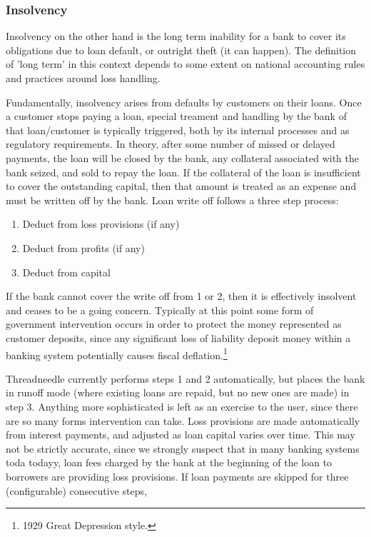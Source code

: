 \documentclass[10pt,oneside,openright, a4paper]{memoir}
\begin{document}
\subsubsection{Insolvency}
Insolvency on the other hand 
is the long term inability for a bank to cover its 
obligations due to loan default, or outright theft (it can happen). 
The definition of 'long term' in this context
depends to some extent on national accounting rules and practices
around loss handling.
\par
Fundamentally, insolvency arises from defaults by customers on their loans.
Once a customer stops paying a loan, special treament and handling
by the bank of that loan/customer is typically triggered, both by its 
internal processes and as regulatory requirements. In theory, after
some number of missed or delayed payments, the loan will be closed
by the bank, any collateral associated with the bank seized,
and sold to repay the loan. If the collateral of the loan is insufficient
to cover the outstanding capital, then that amount is treated as an
expense and must be written 
off by the bank. Loan write off follows a three step process:
\begin{enumerate}
\item Deduct from loss provisions (if any)
\item Deduct from profits (if any)
\item Deduct from capital
\end{enumerate}
If the bank cannot cover the write off from 1 or 2, then it is 
effectively insolvent and ceases to be a going concern. Typically
at this point some form of government intervention occurs in order
to protect the money represented as customer deposits, since any
significant loss of liability deposit money within a banking
system potentially causes fiscal deflation.\footnote{1929 Great
Depression style.}
\par
Threadneedle currently performs steps 1 and 2 automatically, but places
the bank in runoff mode (where existing loans are repaid, but no new
ones are made) in step 3. Anything more sophisticated 
is left as an exercise to the user, since there are so many forms
intervention can take.  Loss provisions are made automatically
from interest payments, and adjusted as loan capital varies over time.
This may not be strictly accurate, since we strongly
suspect that in many banking systems toda todayy, loan fees charged by the bank
at the beginning of the loan to borrowers are providing loss provisions.
If loan payments are skipped for three (configurable) consecutive steps,
\end{document}
